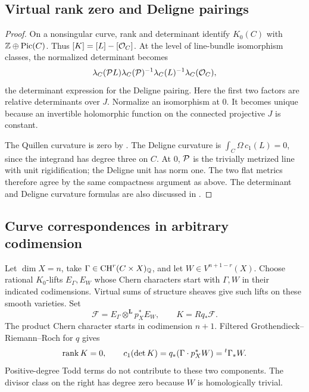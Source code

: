 \subsection{Virtual rank zero and Deligne pairings}
\label{sec:deligne-proof}


\begin{proof}
On a nonsingular curve, rank and determinant identify
\(K_0(C)\) with \(\mathbb Z\oplus\operatorname{Pic}(C)\). Thus
\([K]=[L]-[\mathcal O_C]\). At the level of line-bundle isomorphism
classes, the normalized determinant becomes
\[
 \lambda_C(\mathcal P L)\lambda_C(\mathcal P)^{-1}
       \lambda_C(L)^{-1}\lambda_C(\mathcal O_C),
\]
the determinant expression for the Deligne pairing. Here the first
two factors are relative determinants over \(J\). Normalize an
isomorphism at \(0\). It becomes unique because an invertible
holomorphic function on the connected projective \(J\) is
constant.

The Quillen curvature is zero by
. The Deligne curvature is
\(\int_C\Omega\,c_1(L)=0\), since the integrand has degree
three on \(C\). At \(0\), \(\mathcal P\) is the trivially metrized
line with unit rigidification; the Deligne unit has norm one.
The two flat metrics therefore agree by the same compactness
argument as above. The determinant and Deligne curvature formulas
are also discussed in \cite[Section~2]{BiswasSchumacher}.
\end{proof}

\subsection{Curve correspondences in arbitrary codimension}
\label{sec:correspondence-metric}

Let \(\dim X=n\), take
\(\Gamma\in\operatorname{CH}^r(C\times X)_\mathbb Q\), and let
\(W\in V^{n+1-r}(X)\). Choose rational \(K_0\)-lifts
\(E_\Gamma,E_W\) whose Chern characters start with \(\Gamma,W\)
in their indicated codimensions. Virtual sums of structure sheaves
give such lifts on these smooth varieties. Set
\[
 \mathcal F=E_\Gamma\otimes^{\mathbf L}p_X^*E_W,
 \qquad K=Rq_*\mathcal F.
\]
The product Chern character starts in codimension \(n+1\).
Filtered Grothendieck--Riemann--Roch for \(q\) gives
\begin{equation}\label{eq:grr-leading}
 \operatorname{rank} K=0,\qquad
 c_1(\det K)=q_*(\Gamma\cdot p_X^*W)={}^t\Gamma_*W.
\end{equation}
Positive-degree Todd terms do not contribute to these two
components. The divisor class on the right has degree zero because
\(W\) is homologically trivial.

